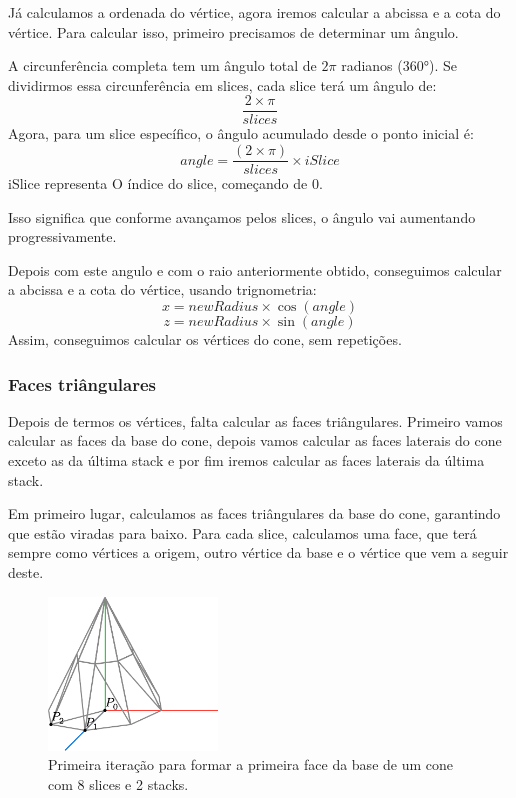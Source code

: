 \documentclass[12pt, a4paper]{article}
\begin{document}
Já calculamos a ordenada do vértice, agora iremos calcular a abcissa e a cota do
vértice. Para calcular isso, primeiro precisamos de determinar um ângulo.

A circunferência completa tem um ângulo total de $2\pi$ radianos (360°).
Se dividirmos essa circunferência em slices, cada slice terá um ângulo de:
$$
\frac{2 \times \pi}{slices}
$$
Agora, para um slice específico, o ângulo acumulado desde o ponto inicial é:
$$
angle = \frac{(2 \times \pi)}{slices}\times iSlice
$$
iSlice representa O índice do slice, começando de 0.

Isso significa que conforme avançamos pelos slices, o ângulo vai aumentando progressivamente.

Depois com este angulo e com o raio anteriormente obtido, conseguimos calcular a abcissa e
a cota do vértice, usando trignometria:
$$
x = newRadius \times \cos(angle)
$$
$$
z = newRadius \times \sin(angle)
$$
Assim, conseguimos calcular os vértices do cone, sem repetições.

\subsubsection{Faces triângulares}

Depois de termos os vértices, falta calcular as faces triângulares. Primeiro vamos calcular
as faces da base do cone, depois vamos calcular as faces laterais do cone exceto as da
última stack e por fim iremos calcular as faces laterais da última stack.

Em primeiro lugar, calculamos as faces triângulares da base do cone, garantindo que estão viradas
para baixo. Para cada slice, calculamos uma face, que terá sempre como vértices a origem,
outro vértice da base e o vértice que vem a seguir deste.

\begin{figure}[H]
    \centering
    \includegraphics[width=0.4\textwidth]{res/figures/Cone3.pdf}
    \caption{
        Primeira iteração para formar a primeira face da base de um cone com 8 slices e 2 stacks.
    }
\end{figure}
\end{document}
